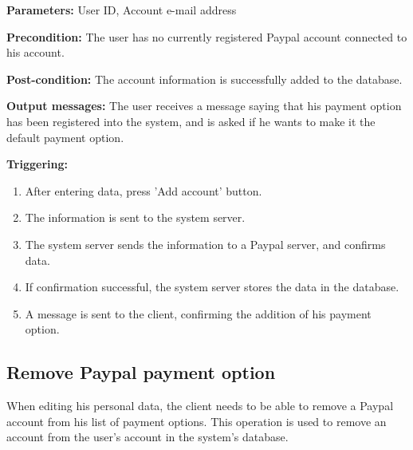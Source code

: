 \begin{description}

\item \textbf{Parameters:} User ID, Account e-mail address

\item \textbf{Precondition:} The user has no currently registered Paypal account connected to his account.

\item \textbf{Post-condition:} The account information is successfully added to
the database.

\item \textbf{Output messages:} The user receives a message saying that his
payment option has been registered into the system, and is asked if he wants to
make it the default payment option.

\item \textbf{Triggering:}
\begin{enumerate}
\item After entering data, press 'Add account' button.

\item The information is sent to the system server.

\item The system server sends the information to a Paypal server, and
confirms data.

\item If confirmation successful, the system server stores the data in the
database.

\item A message is sent to the client, confirming the addition of his payment
option.

\end{enumerate}

\end{description}

\subsection{Remove Paypal payment option}

 When editing his personal data, the client needs to be
 able to remove a Paypal account from his list of payment options. This
 operation is used to remove an account from the user's account in the system's
 database.

